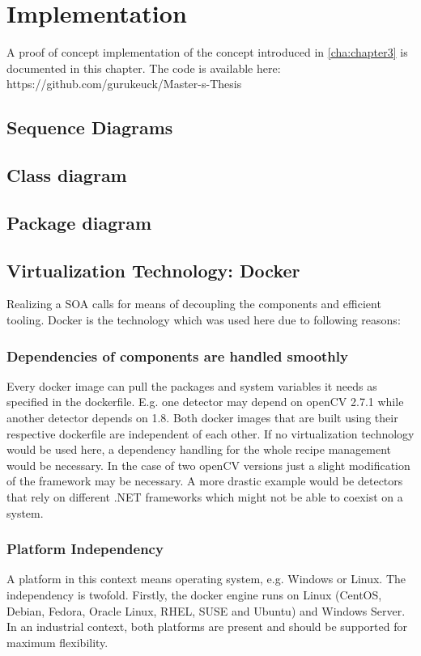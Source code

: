 \chapter{Implementation\label{cha:chapter4}}
A proof of concept implementation of the concept introduced in \ref{cha:chapter3} is documented in this chapter. The code is available here: https://github.com/gurukeuck/Master-s-Thesis

\section{Sequence Diagrams}
\section{Class diagram}
\section{Package diagram}

\section{Virtualization Technology: Docker}
Realizing a SOA calls for means of decoupling the components and efficient tooling. Docker is the technology which was used here due to following reasons:
\subsection{Dependencies of components are handled smoothly} 
Every docker image can pull the packages and system variables it needs as specified in the dockerfile. E.g. one detector may depend on openCV 2.7.1 while another detector depends on 1.8. Both docker images that are built using their respective dockerfile are independent of each other. If no virtualization technology would be used here, a dependency handling for the whole recipe management would be necessary. In the case of two openCV versions just a slight modification of the framework may be necessary. A more drastic example would be detectors that rely on different .NET frameworks which might not be able to coexist on a system.
\subsection{Platform Independency}
 A platform in this context means operating system, e.g. Windows or Linux. The independency is twofold. Firstly, the docker engine runs on Linux (CentOS, Debian, Fedora, Oracle Linux, RHEL, SUSE and Ubuntu) and Windows Server. In an industrial context, both platforms are present and should be supported for maximum flexibility.
